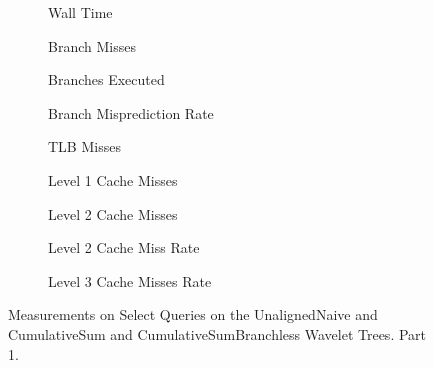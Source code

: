 \clearpage




\begin{figure}\tiny

\begin{subfigure}{0.30\textwidth}
	
	\caption{Wall Time}
	\label{fig:CumulativeSumSelectWalltime}
\end{subfigure}
\hfill
\begin{subfigure}{0.30\textwidth}
	
	\caption{Branch Misses}
	\label{fig:CumulativeSumSelectBranchMiss}
\end{subfigure}
\hfill
\begin{subfigure}{0.30\textwidth}
	
	\caption{Branches Executed}
	\label{fig:CumulativeSumSelectBranchExe}
\end{subfigure}


\begin{subfigure}{0.30\textwidth}
	
	\caption{Branch Misprediction Rate}
	\label{fig:CumulativeSumSelectBranchMissRate}
\end{subfigure}
\hfill
\begin{subfigure}{0.30\textwidth}
	
	\caption{TLB Misses}
	\label{fig:CumulativeSumSelectTLBMiss}
\end{subfigure}
\hfill
\begin{subfigure}{0.30\textwidth}
	
	\caption{Level 1 Cache Misses}
	\label{fig:CumulativeSumSelectL1CM}
\end{subfigure}


\begin{subfigure}{0.30\textwidth}
	
	\caption{Level 2 Cache Misses}
	\label{fig:CumulativeSumSelectL2CM}
\end{subfigure}
\hfill
%	
\begin{subfigure}{0.30\textwidth}
	
	\caption{Level 2 Cache Miss Rate}
	\label{fig:CumulativeSumSelectL2CMRate}
\end{subfigure}
\hfill
\begin{subfigure}{0.30\textwidth}
	
	\caption{Level 3 Cache Misses Rate}
	\label{fig:CumulativeSumSelectL3CM}
\end{subfigure}

\caption{Measurements on Select Queries on the UnalignedNaive and CumulativeSum and CumulativeSumBranchless Wavelet Trees. Part 1.}
\label{fig:CumulativeSumSelect}
\end{figure}





\restoregeometry













